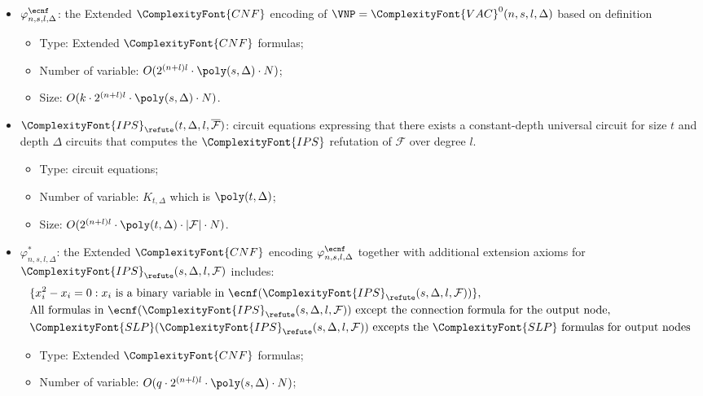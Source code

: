 \documentclass[11pt,letter]{article}
\theoremstyle{remark} %
\newcommand{\IPS}{%
    {
        \ComplexityFont{IPS} 
    }
}
\newcommand{\CNF}{ %
    {
        \ComplexityFont{CNF}
    }
}
\newcommand{\SLP}{ %
    {
        \ComplexityFont{SLP}
    }
}
\newcommand{\VAC}{
    {
        \ComplexityFont{VAC}
    }
}
\begin{document}
{\begin{itemize}
\begin{itemize}
            \end{itemize}
        \item $\varphi_{n,s,l,\Delta}^\ecnf$: the Extended $\CNF$ encoding of $\VNP=\VAC^0(n,s,l,\Delta)$ based on definition 
            \begin{itemize}
                \item Type: Extended $\CNF$ formulas;
                \item Number of variable: $O(2^{(n+l)l} \cdot \poly(s, \Delta) \cdot N)$;
                \item Size: $O(k \cdot 2^{(n+l)l} \cdot \poly(s, \Delta) \cdot N)$.
            \end{itemize}
        \item $\IPS_{\refute}(t,\Delta,l,\overline{\mathcal{F}})$: circuit equations expressing that there exists a constant-depth universal circuit for size $t$ and depth $\Delta$ circuits that computes the $\IPS$ refutation of $\mathcal{F}$ over degree $l$.
            \begin{itemize}
                \item Type: circuit equations;
                \item Number of variable: $K_{t, \Delta}$ which is $\poly(t, \Delta)$;
                \item Size: $O(2^{(n+l)l} \cdot \poly(t, \Delta) \cdot |\mathcal{F}| \cdot N)$.
            \end{itemize}
        \item $\varphi_{n,s,l,\Delta}^\ast$: the Extended $\CNF$ encoding $\varphi_{n,s,l,\Delta}^\ecnf$ together with additional extension axioms for $\IPS_{\refute}(s,\Delta,l,\mathcal{F})$ includes:
        \begin{align*}
            &\{x_i^2-x_i =0: x_i \text{ is a binary variable in }\ecnf(\IPS_{\refute}(s,\Delta,l,\mathcal{F}))\}, \\
            &\text{All formulas in }\ecnf(\IPS_{\refute}(s,\Delta,l,\mathcal{F})) \text{ except the connection formula for the output node},\\
            &\SLP(\IPS_{\refute}(s,\Delta,l,\mathcal{F})) \text{ excepts the $\SLP$ formulas for output nodes}
        \end{align*}
            \begin{itemize}
                \item Type: Extended $\CNF$ formulas;
                \item Number of variable: $O(q \cdot 2^{(n+l)l} \cdot \poly(s, \Delta) \cdot N)$;

\end{itemize}
\end{itemize}}
\end{document}
